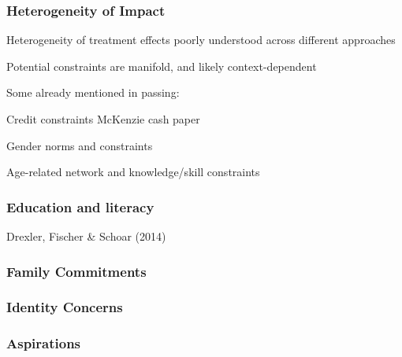 \documentclass[hideothersubsections, usenames,dvipsnames,10pt]{beamer}
\newenvironment{itemize_3pt}{\itemize\addtolength{\itemsep}{3pt}}{\enditemize}
\begin{document}
\begin{frame}
\frametitle{Heterogeneity of Impact}
	\begin{itemize_3pt}
	\item Heterogeneity of treatment effects poorly understood across different approaches
	\item Potential constraints are manifold, and likely context-dependent
	\item Some already mentioned in passing:
	\begin{itemize_3pt}
		\item Credit constraints \citep[see, e.g.,][]{} McKenzie cash paper
		\item Gender norms and constraints
		\item Age-related network and knowledge/skill constraints
	\end{itemize_3pt} 
	\vspace{0.1in}
	\end{itemize_3pt}
\end{frame}

\begin{frame}
\frametitle{Education and literacy}
	\begin{itemize_3pt}
	\item Drexler, Fischer \& Schoar (2014) \citep{Drexler2014}
	\vspace{0.1in}
	\end{itemize_3pt}
\end{frame}

\begin{frame}
\frametitle{Family Commitments}
	\begin{itemize_3pt}
	\item 
	\vspace{0.1in}
	\end{itemize_3pt}
\end{frame}

\begin{frame}
\frametitle{Identity Concerns}
	\begin{itemize_3pt}
	\item 
	\vspace{0.1in}
	\end{itemize_3pt}
\end{frame}

\begin{frame}
\frametitle{Aspirations}
	\begin{itemize_3pt}
	\item 
	\vspace{0.1in}
	\end{itemize_3pt}
\end{frame}
\end{document}

